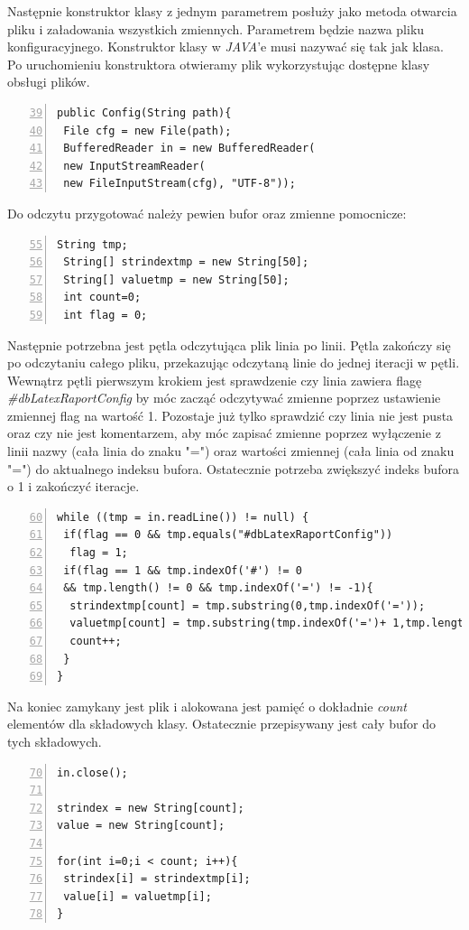 Następnie konstruktor klasy z jednym parametrem posłuży jako metoda otwarcia pliku i załadowania wszystkich zmiennych. Parametrem będzie nazwa pliku konfiguracyjnego. Konstruktor klasy w \emph{JAVA}'e musi nazywać się tak jak klasa. Po uruchomieniu konstruktora otwieramy plik wykorzystując dostępne klasy obsługi plików.
\begin{lstlisting}[numbers=left,firstnumber=39]
public Config(String path){
 File cfg = new File(path);
 BufferedReader in = new BufferedReader(
 new InputStreamReader(
 new FileInputStream(cfg), "UTF-8"));
\end{lstlisting}
Do odczytu przygotować należy pewien bufor oraz zmienne pomocnicze:
\begin{lstlisting}[numbers=left,firstnumber=55]
 String tmp;
 String[] strindextmp = new String[50];
 String[] valuetmp = new String[50];
 int count=0;
 int flag = 0;
\end{lstlisting}

Następnie potrzebna jest pętla odczytująca plik linia po linii. Pętla zakończy się po odczytaniu całego pliku, przekazując odczytaną linie do jednej iteracji w pętli. Wewnątrz pętli pierwszym krokiem jest sprawdzenie czy linia zawiera flagę \emph{\#dbLatexRaportConfig} by móc zacząć odczytywać zmienne poprzez ustawienie zmiennej flag na wartość 1. Pozostaje już tylko sprawdzić czy linia nie jest pusta oraz czy nie jest komentarzem, aby móc zapisać zmienne poprzez wyłączenie z linii nazwy (cała linia do znaku "=") oraz wartości zmiennej (cała linia od znaku "=") do aktualnego indeksu bufora. Ostatecznie potrzeba zwiększyć indeks bufora o 1 i zakończyć iteracje.
\begin{lstlisting}[numbers=left,firstnumber=60]
while ((tmp = in.readLine()) != null) {
 if(flag == 0 && tmp.equals("#dbLatexRaportConfig"))
  flag = 1;
 if(flag == 1 && tmp.indexOf('#') != 0
 && tmp.length() != 0 && tmp.indexOf('=') != -1){
  strindextmp[count] = tmp.substring(0,tmp.indexOf('='));
  valuetmp[count] = tmp.substring(tmp.indexOf('=')+ 1,tmp.length());
  count++;
 }
}
\end{lstlisting}

Na koniec zamykany jest plik i alokowana jest pamięć o dokładnie \emph{count} elementów dla składowych klasy. Ostatecznie przepisywany jest cały bufor do tych składowych.
\begin{lstlisting}[numbers=left,firstnumber=70]
in.close();
        
strindex = new String[count];
value = new String[count];
                  
for(int i=0;i < count; i++){
 strindex[i] = strindextmp[i];
 value[i] = valuetmp[i];
}
\end{lstlisting}

